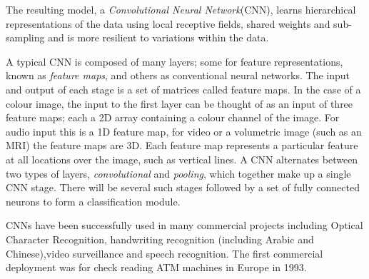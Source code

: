 The resulting model, a \textit{Convolutional Neural Network}(CNN)\citep{dengthree}, learns hierarchical representations of the data using local receptive fields, shared weights and sub-sampling and is more resilient to variations within the data\citep{lecun2010convolutional}.

A typical CNN is composed of many layers; some for feature representations, known as \textit{feature maps}, and others as conventional neural networks.
The input and output of each stage is a set of matrices called feature maps.
In the case of a colour image, the input to the first layer can be thought of as an input of three feature maps; each a 2D array containing a colour channel of the image.
For audio input this is a 1D feature map, for video or a volumetric image (such as an MRI) the feature maps are 3D.
Each feature map represents a particular feature at all locations over the image, such as vertical lines.
A CNN alternates between two types of layers, \textit{convolutional} and \textit{pooling}, which together make up a single CNN stage\citep{chen2014big}.
There will be several such stages followed by a set of fully connected neurons to form a classification module\citep{lecun2010convolutional}.

CNNs have been successfully used in many commercial projects including Optical Character Recognition, handwriting recognition (including Arabic and Chinese),video surveillance\citep{bengio2009advances} and speech recognition\citep{dengthree}\citep{haffner1998high}\citep{krizhevsky2012imagenet}\citep{donahue2014decaf}\citep{simonyan2014very}\citep{abdel2012applying}\citep{sainath2013learning}.
The first commercial deployment was for check reading ATM machines in Europe in 1993\citep{bengio2009advances}.

